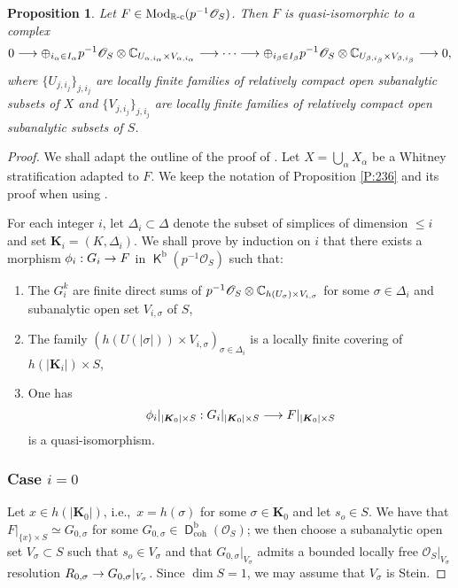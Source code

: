 \documentclass[english]{smfart}
\numberwithin{subsection}{section}
\newenvironment{enumeratea}
{\bgroup\def\theenumi{\alph{enumi}}\begin{enumerate}}
{\end{enumerate}\egroup}
\def\sho{\mathcal{O}}\let\cO\sho
\newcommand{\R}{\mathbb{R}}\let\RR\R
\newcommand{\bK}{\boldsymbol{K}}
\newcommand{\rb}{\mathrm{b}}
\newcommand{\coh}{\mathrm{coh}}
\newcommand{\Mod}{\mathrm{Mod}}
\newcommand{\rc}{{\R\textup{-c}}}
\DeclareMathOperator{\rD}{\mathsf{D}}
\DeclareMathOperator{\rK}{\mathsf{K}}
\let\leq\leqslant
\def\ie{i.e.,\ }
\newcommand{\pOS}{p^{-1}\sho_S}
\numberwithin{equation}{section}
\theoremstyle{plain}
\newtheorem{proposition}[equation]{Proposition}
\theoremstyle{definition}
\def\to{\mathchoice{\longrightarrow}{\rightarrow}{\rightarrow}{\rightarrow}}
\begin{document}
\begin{proposition}\label{P:C1}
Let $F\in \Mod_\rc(\pOS)$. Then $F$ is quasi-isomorphic to a complex
$$0\to\oplus_{i_{\alpha}\in I_{\alpha}} \pOS \otimes \CC_{U_{\alpha, i_{\alpha}}\times V_{\alpha,i_{\alpha}}}\to\cdots\to\oplus_{i_{\beta}\in I_{\beta}} \pOS \otimes \CC_{U_{\beta, i_{\beta}}\times V_{\beta,i_{\beta}}} \to 0,$$
where $\{U_{j,i_j}\}_{j,i_j}$ are locally finite families of relatively compact open subanalytic subsets of $X$ and $\{V_{j,i_j}\}_{j,i_j}$ are locally finite families of relatively compact open subanalytic subsets of $S$.
\end{proposition}

\begin{proof}
We shall adapt the outline of the proof of \cite[Prop.\,A.2]{D-G-S11}. Let $X=\bigcup_{\alpha}X_{\alpha}$ be a Whitney stratification adapted to $F$. We keep the notation of Proposition \ref{P:236} and its proof when using \cite[Prop.\,8.2.5]{K-S90}.

For each integer $i$, let $\Delta_i\subset\Delta$ denote the subset of simplices of dimension $\leq i$ and set $\bK_i=(K, \Delta_i)$. We shall prove by induction on $i$ that there exists a morphism $\phi_i:G_i\to F$ in $\rK^{\rb}(\pOS)$ such that:
\begin{enumeratea}
\item\label{enum:Ka}
The $G^k_i$ are finite direct sums of $\pOS\otimes \CC_{h(U_{\sigma})\times V_{i,\sigma}}$ for some $\sigma\in\Delta_i$ and subanalytic open set $V_{i,\sigma}$ of $S$,
\item\label{enum:Kb}
The family $(h(U(|\sigma|))\times V_{i,\sigma})_{\sigma\in\Delta_i}$ is a locally finite covering of $h(|\bK_i|)\times S$,
\item\label{enum:Kc}
One has
$$\phi_i|_{|\bK_0|\times S}: G_i|_{|\bK_0|\times S}\to F|_{|\bK_0|\times S}$$ is a quasi-isomorphism.
\end{enumeratea}

\subsubsection*{Case $i=0$}

Let $x\in h(|\bK_0|)$, \ie $x=h(\sigma)$ for some $\sigma\in\bK_0$ and let $s_o\in S$. We have that $F|_{\{x\}\times S}\simeq G_{0,\sigma}$ for some $G_{0,\sigma}\in \rD^{\rb}_{\coh}(\sho_S)$; we then choose a subanalytic open set $V_{\sigma}\subset S$ such that $s_o\in V_{\sigma}$ and that $G_{0,\sigma}|_{V_{\sigma}}$ admits a bounded locally free $\sho_S|_{V_{\sigma}}$ resolution $R_{0, \sigma}\to G_{0,\sigma}|_{V_{\sigma}}$. Since $\dim S=1$, we may assume that $V_{\sigma}$ is Stein.


\end{proof}
\end{document}
